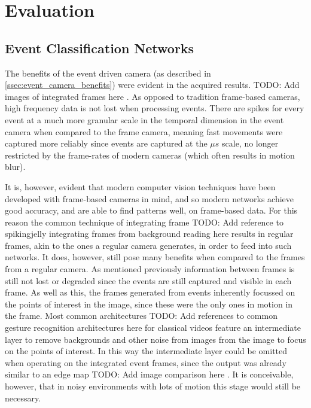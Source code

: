 \chapter{Evaluation} \label{chap:evaluation}

\section{Event Classification Networks}

The benefits of the event driven camera (as described in \cref{ssec:event_camera_benefits}) were evident in the acquired results. \color{red} TODO: Add images of integrated frames here \color{black}. As opposed to tradition frame-based cameras, high frequency data is not lost when processing events. There are spikes for every event at a much more granular scale in the temporal dimension in the event camera when compared to the frame camera, meaning fast movements were captured more reliably since events are captured at the $\mu s$ scale, no longer restricted by the frame-rates of modern cameras (which often results in motion blur).

It is, however, evident that modern computer vision techniques have been developed with frame-based cameras in mind, and so modern networks achieve good accuracy, and are able to find patterns well, on frame-based data. For this reason the common technique of integrating frame \color{red} TODO: Add reference to spikingjelly integrating frames from background reading here \color{black} results in regular frames, akin to the ones a regular camera generates, in order to feed into such networks. It does, however, still pose many benefits when compared to the frames from a regular camera. As mentioned previously information between frames is still not lost or degraded since the events are still captured and visible in each frame. As well as this, the frames generated from events inherently focussed on the points of interest in the image, since these were the only ones in motion in the frame. Most common architectures \color{red} TODO: Add references to common gesture recognition architectures here \color{black} for classical videos feature an intermediate layer to remove backgrounds and other noise from images from the image to focus on the points of interest. In this way the intermediate layer could be omitted when operating on the integrated event frames, since the output was already similar to an edge map \color{red} TODO: Add image comparison here \color{black}. It is conceivable, however, that in noisy environments with lots of motion this stage would still be necessary.

